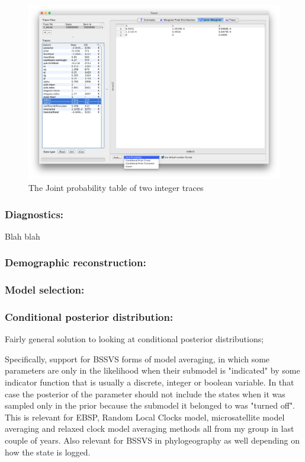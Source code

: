 \documentclass{bioinfo}
\begin{document}
\begin{figure}[H]
\includegraphics[width=.5\textwidth]{./figures/jointPrInt.png}  
\caption{The Joint probability table of two integer traces}
\label{fig:int:jointpr}
\end{figure}



\subsubsection*{Diagnostics:} Blah blah 

\subsubsection*{Demographic reconstruction:} 

\subsubsection*{Model selection:}


\subsubsection*{Conditional posterior distribution:}

Fairly general solution to looking at conditional posterior distributions;

Specifically, support for BSSVS forms of model averaging, in which some parameters are only in the likelihood when their submodel is "indicated" by some indicator function that is usually a discrete, integer or boolean variable. In that case the posterior of the parameter should not include the states when it was sampled only in the prior because the submodel it belonged to was "turned off". This is relevant for EBSP, Random Local Clocks model, microsatellite model averaging and relaxed clock model averaging methods all from my group in last couple of years. Also relevant for BSSVS in phylogeography as well depending on how the state is logged.
\end{document}
